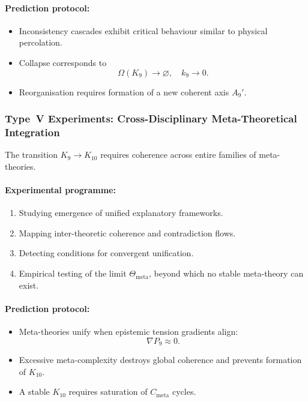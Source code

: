 \paragraph{Prediction protocol:}

\begin{itemize}
    \item Inconsistency cascades exhibit critical behaviour
          similar to physical percolation.
    \item Collapse corresponds to
          \[
              \Omega(K_9) \to \varnothing,\quad k_9 \to 0.
          \]
    \item Reorganisation requires formation of a new coherent axis $A_9'$.
\end{itemize}



\subsubsection{Type~V Experiments: Cross-Disciplinary Meta-Theoretical Integration}

The transition $K_9 \to K_{10}$ requires coherence across entire
families of meta-theories.

\paragraph{Experimental programme:}

\begin{enumerate}
    \item Studying emergence of unified explanatory frameworks.
    \item Mapping inter-theoretic coherence and contradiction flows.
    \item Detecting conditions for convergent unification.
    \item Empirical testing of the limit
          $\Theta_{\mathrm{meta}}$, beyond which no stable
          meta-theory can exist.
\end{enumerate}

\paragraph{Prediction protocol:}

\begin{itemize}
    \item Meta-theories unify when epistemic tension gradients align:
          \[
              \nabla P_9 \approx 0.
          \]
    \item Excessive meta-complexity destroys global coherence and
          prevents formation of $K_{10}$.
    \item A stable $K_{10}$ requires saturation of $C_{\mathrm{meta}}$ cycles.
\end{itemize}




